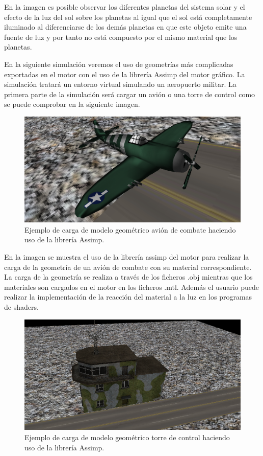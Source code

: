 \documentclass[a4paper, 17pt]{book}
\begin{document}
En la imagen es posible observar los diferentes planetas del sistema solar y el efecto de la luz del sol sobre los planetas al igual que
el sol está completamente iluminado al diferenciarse de los demás planetas en que este objeto emite una fuente de luz y por tanto no está
compuesto por el mismo material que los planetas.

En la siguiente simulación veremos el uso de geometrías más complicadas exportadas en el motor con el uso de la librería Assimp del
motor gráfico. La simulación tratará un entorno virtual simulando un aeropuerto militar. La primera parte de la simulación será cargar
un avión o una torre de control como se puede comprobar en la siguiente imagen.

\begin{figure}[hbt!]
    \centering
    \includegraphics[scale=0.25, keepaspectratio]{img/Airplane.png}
    \caption{Ejemplo de carga de modelo geométrico avión de combate haciendo uso de la librería Assimp.}
    \label{figura:Avion}
\end{figure}

En la imagen se muestra el uso de la librería assimp del motor para realizar la carga de la geometría de un avión de combate con su
material correspondiente. La carga de la geometría se realiza a través de los ficheros .obj mientras que los materiales son cargados
en el motor en los ficheros .mtl. Además el usuario puede realizar la implementación de la reacción del material a la luz en los programas
de shaders.

\begin{figure}[hbt!]
    \centering
    \includegraphics[scale=0.25, keepaspectratio]{img/Tower.png}
    \caption{Ejemplo de carga de modelo geométrico torre de control haciendo uso de la librería Assimp.}
    \label{figura:Avion}
\end{figure}
\end{document}
